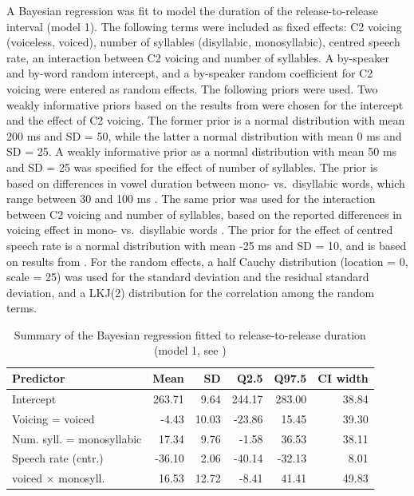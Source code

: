 \documentclass[
  12pt,
  a4paper,
]{article}
\begin{document}
A Bayesian regression was fit to model the duration of the
release-to-release interval (model 1). The following terms were included
as fixed effects: C2 voicing (voiceless, voiced), number of syllables
(disyllabic, monosyllabic), centred speech rate, an interaction between
C2 voicing and number of syllables. A by-speaker and by-word random
intercept, and a by-speaker random coefficient for C2 voicing were
entered as random effects. The following priors were used. Two weakly
informative priors based on the results from \citet{coretta2018j} were
chosen for the intercept and the effect of C2 voicing. The former prior
is a normal distribution with mean 200 ms and SD = 50, while the latter
a normal distribution with mean 0 ms and SD = 25. A weakly informative
prior as a normal distribution with mean 50 ms and SD = 25 was specified
for the effect of number of syllables. The prior is based on differences
in vowel duration between mono- vs.~disyllabic words, which range
between 30 and 100 ms \citep{sharf1962, klatt1973}. The same prior was
used for the interaction between C2 voicing and number of syllables,
based on the reported differences in voicing effect in mono-
vs.~disyllabic words \citep{sharf1962, klatt1973}. The prior for the
effect of centred speech rate is a normal distribution with mean -25 ms
and SD = 10, and is based on results from \citet{coretta2018j}. For the
random effects, a half Cauchy distribution (location = 0, scale = 25)
was used for the standard deviation and the residual standard deviation,
and a LKJ(2) distribution for the correlation among the random terms.

\begin{table}[t]

\caption{\label{tab:rr-1-table}Summary of the Bayesian regression fitted to release-to-release duration (model 1, see )}
\centering
\fontsize{8}{10}\selectfont
\begin{tabular}{lrrrrr}
\toprule
Predictor & Mean & SD & Q2.5 & Q97.5 & CI width\\
\midrule
Intercept & 263.71 & 9.64 & 244.17 & 283.00 & 38.84\\
Voicing = voiced & -4.43 & 10.03 & -23.86 & 15.45 & 39.30\\
Num. syll. = monosyllabic & 17.34 & 9.76 & -1.58 & 36.53 & 38.11\\
Speech rate (cntr.) & -36.10 & 2.06 & -40.14 & -32.13 & 8.01\\
voiced × monosyll. & 16.53 & 12.72 & -8.41 & 41.41 & 49.83\\
\bottomrule
\end{tabular}
\end{table}
\end{document}
